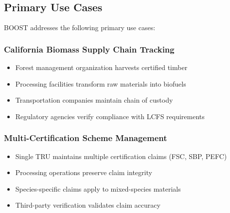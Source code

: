
\subsection{Primary Use Cases}
\label{sec:primary-use-cases}

BOOST addresses the following primary use cases:

\subsubsection{California Biomass Supply Chain Tracking}
\label{sec:california-use-case}

\begin{itemize}
    \item Forest management organization harvests certified timber
    \item Processing facilities transform raw materials into biofuels
    \item Transportation companies maintain chain of custody
    \item Regulatory agencies verify compliance with LCFS requirements
\end{itemize}

\subsubsection{Multi-Certification Scheme Management}
\label{sec:multi-cert-use-case}

\begin{itemize}
    \item Single TRU maintains multiple certification claims (FSC, SBP, PEFC)
    \item Processing operations preserve claim integrity
    \item Species-specific claims apply to mixed-species materials
    \item Third-party verification validates claim accuracy
\end{itemize}